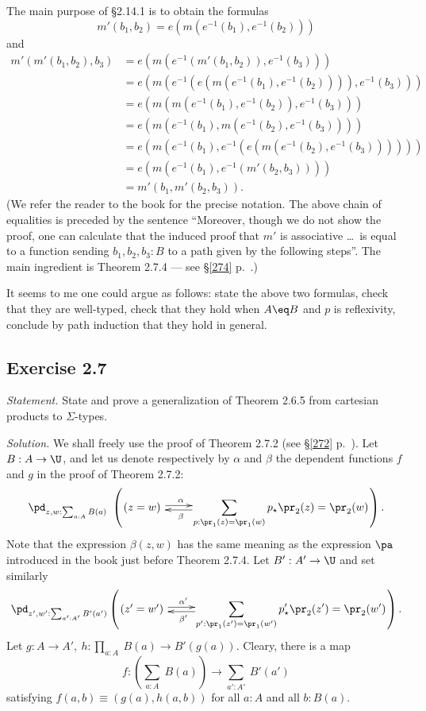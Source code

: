 \documentclass[12pt]{article}
\begin{document}
The main purpose of \S2.14.1 is to obtain the formulas
$$
m'(b_1,b_2)=e(m(e^{-1}(b_1),e^{-1}(b_2)))
$$ 
and
\begin{equation*}
  \begin{aligned}
    m'(m'(b_1,b_2),b_3)
    &= e(m(e^{-1}(m'(b_1,b_2)),e^{-1}(b_3))) \\
    &= e(m(e^{-1}(e(m(e^{-1}(b_1),e^{-1}(b_2)))),e^{-1}(b_3))) \\
    &= e(m(m(e^{-1}(b_1),e^{-1}(b_2)),e^{-1}(b_3))) \\
    &= e(m(e^{-1}(b_1),m(e^{-1}(b_2),e^{-1}(b_3)))) \\
    &= e(m(e^{-1}(b_1),e^{-1}(e(m(e^{-1}(b_2),e^{-1}(b_3)))))) \\
    &= e(m(e^{-1}(b_1),e^{-1}(m'(b_2,b_3)))) \\
    &= m'(b_1,m'(b_2,b_3)).
\end{aligned}
\end{equation*}
(We refer the reader to the book for the precise notation. The above chain of equalities is preceded by the sentence ``Moreover, though we do not show the proof, one can calculate that the induced proof that $m'$ is associative \dots\ is equal to a function sending $b_1,b_2,b_3:B$ to a path given by the following steps''. The main ingredient is Theorem 2.7.4 --- see \S\ref{274} p.~\pageref{274}.)

It seems to me one could argue as follows: state the above two formulas, check that they are well-typed, check that they hold when $A\eq B$ and $p$ is reflexivity, conclude by path induction that they hold in general.



\subsection{Exercise 2.7}

\emph{Statement.} State and prove a generalization of Theorem 2.6.5 from cartesian products to $\Sigma$-types. 

\nn\emph{Solution.} We shall freely use the proof of Theorem 2.7.2 (see \S\ref{272} p.~\pageref{272}). Let $B:A\to\U$, and let us denote respectively by $\alpha$ and $\beta$ the dependent functions $f$ and $g$ in the proof of Theorem 2.7.2:
$$
\pd_{z,w:\sum_{a:A}B(a)}\ \left(\xymatrix@1{
(z=w)\ \ar@<2pt>[r]^(.27)\alpha&\displaystyle\sum_{p:\pr_1(z)=\pr_1(w)}p_\star \pr_2(z)=\pr_2(w)\ar@<2pt>[l]^(.73)\beta}\right).
$$ 
Note that the expression $\beta(z,w)$ has the same meaning as the expression $\pa$ introduced in the book just before Theorem 2.7.4. Let $B':A'\to\U$ and set similarly 
$$
\pd_{z',w':\sum_{a':A'}B'(a')}\left(\xymatrix@1{
(z'=w')\ \ar@<2pt>[r]^(.27){\alpha'}&\displaystyle\sum_{p':\pr_1(z')=\pr_1(w')}p'_\star \pr_2(z')=\pr_2(w')\ar@<2pt>[l]^(.73){\beta'}}\right).
$$ 
Let $g:A\to A',\ h:\prod_{a:A}\ B(a)\to B'(g(a))$. Cleary, there is a map 
$$
f:\left(\sum_{a:A}\ B(a)\right)\to\sum_{a':A'}\ B'(a')
$$ 
satisfying $f(a,b)\equiv (g(a),h(a,b))$ for all $a:A$ and all $b:B(a)$. 
\end{document}

